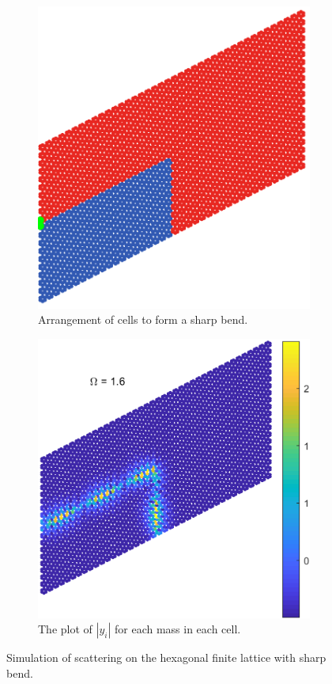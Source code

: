 \begin{figure}
\centering
\begin{subfigure}[b]{.5\textwidth}
  \centering
  \includegraphics[width=0.8\linewidth]{imgs/sharpbendarr.png}
  \caption{Arrangement of cells to form a sharp bend.}
  \label{fig:sub1}
\end{subfigure}%
\begin{subfigure}[b]{.5\textwidth}
  \centering
  \includegraphics[width=1\linewidth]{imgs/sharpbendscat.png}
  \caption{The plot of $|y_i|$ for each mass in each cell.}
  \label{fig:sub2}
\end{subfigure}
\caption{Simulation of scattering on the hexagonal finite lattice with sharp
  bend.}
\label{fig:sharpbend}
\end{figure}

